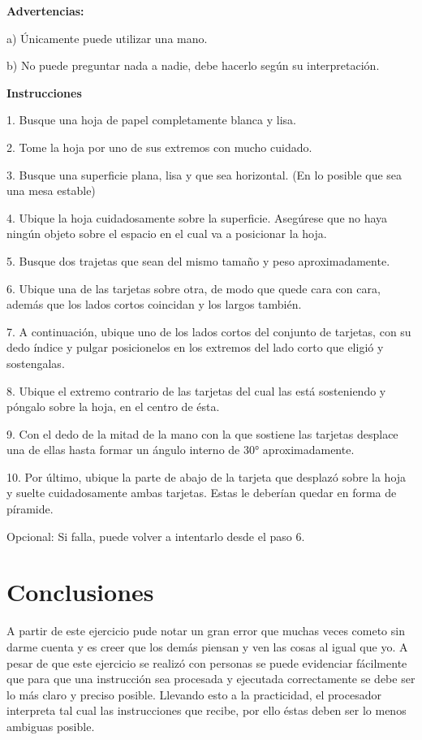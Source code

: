 \documentclass{article}
\begin{document}
\vspace{5mm}

\textbf{Advertencias:}

a) Únicamente puede utilizar una mano.

b) No puede preguntar nada a nadie, debe hacerlo según su interpretación.

\vspace{5mm}

\textbf{Instrucciones}

\vspace{5mm}

1. Busque una hoja de papel completamente blanca y lisa.

2. Tome la hoja por uno de sus extremos con mucho cuidado.

3. Busque una superficie plana, lisa y que sea horizontal. (En lo posible que sea una mesa estable)

4. Ubique la hoja cuidadosamente sobre la superficie. Asegúrese que no haya ningún objeto sobre el espacio en el cual va a posicionar la hoja.

5. Busque dos trajetas que sean del mismo tamaño y peso aproximadamente.

6. Ubique una de las tarjetas sobre otra, de modo que quede cara con cara, además que los lados cortos coincidan y los largos también.

7. A continuación, ubique uno de los lados cortos del conjunto de tarjetas, con su dedo índice y pulgar posicionelos en los extremos del lado corto que eligió y sostengalas.

8. Ubique el extremo contrario de las tarjetas del cual las está sosteniendo y póngalo sobre la hoja, en el centro de ésta.

9. Con el dedo de la mitad de la mano con la que sostiene las tarjetas desplace una de ellas hasta formar un ángulo interno de 30° aproximadamente.

10. Por último, ubique la parte de abajo de la tarjeta que desplazó sobre la hoja y suelte cuidadosamente ambas tarjetas. Estas le deberían quedar en forma de píramide.

Opcional: Si falla, puede volver a intentarlo desde el paso 6.

\section{Conclusiones} \label{conclusiones}

A partir de este ejercicio pude notar un gran error que muchas veces cometo sin darme cuenta y es creer que los demás piensan y ven las cosas al igual que yo. A pesar de que este ejercicio se realizó con personas se puede evidenciar fácilmente que para que una instrucción sea procesada y ejecutada correctamente se debe ser lo más claro y preciso posible. Llevando esto a la practicidad, el procesador interpreta tal cual las instrucciones que recibe, por ello éstas deben ser lo menos ambiguas posible. 
\end{document}
